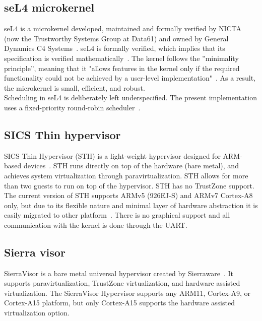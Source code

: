 \subsection{seL4 microkernel}
seL4 is a microkernel developed, maintained and formally verified by NICTA (now the Trustworthy Systems Group at Data61) and owned by General Dynamics C4 Systems~\cite{sel4}. seL4 is formally verified, which implies that its specification is verified mathematically~\cite{sel4math}. The kernel follows the ”minimality principle”, meaning that it "allows features in the kernel only if the required functionality could not be achieved by a user-level implementation"~\cite{lyons2014}. As a result, the microkernel is small, efficient, and robust.\\

Scheduling in seL4 is deliberately left underspecified. The present implementation uses a fixed-priority round-robin scheduler~\cite{lyons2014}.

\subsection{SICS Thin hypervisor}
SICS Thin Hypervisor (STH) is a light-weight hypervisor designed for ARM-based devices~\cite{STH2013}. STH runs directly on top of the hardware (bare metal), and achieves system virtualization through paravirtualization. STH allows for more than two guests to run on top of the hypervisor. STH has no TrustZone support.\\

The current version of STH supports ARMv5 (926EJ-S) and ARMv7 Cortex-A8 only, but due to its flexible nature and minimal layer of hardware abstraction it is easily migrated to other platform~\cite{STH2013}. There is no graphical support and all communication with the kernel is done through the UART.

\subsection{Sierra visor}
SierraVisor is a bare metal universal hypervisor created by Sierraware~\cite{sierraware}. It supports paravirtualization, TrustZone virtualization, and hardware assisted virtualization. The SierraVisor Hypervisor supports any ARM11, Cortex-A9, or Cortex-A15 platform, but only Cortex-A15 supports the hardware assisted virtualization option. 

